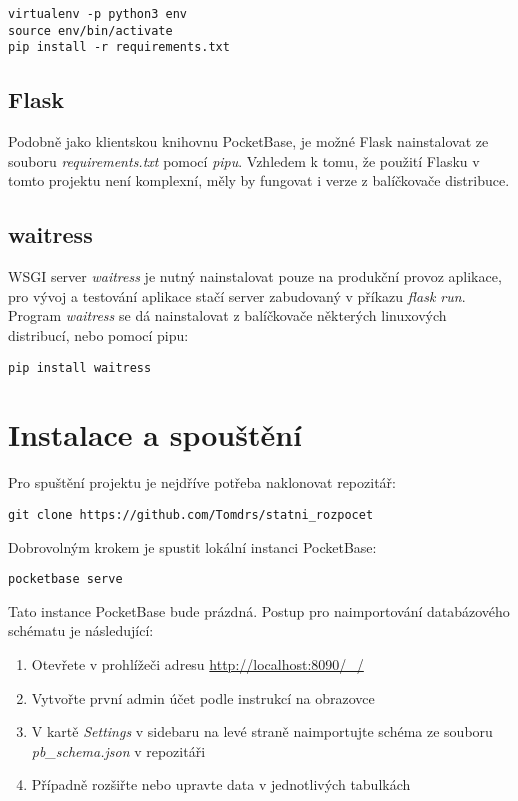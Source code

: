 \documentclass[11pt,a4paper,twoside,openright]{report}
\begin{document}
\begin{verbatim}
virtualenv -p python3 env
source env/bin/activate
pip install -r requirements.txt
\end{verbatim}

\subsection{Flask}
Podobně jako klientskou knihovnu PocketBase, je možné Flask nainstalovat ze souboru
\emph{requirements.txt} pomocí \emph{pipu}. Vzhledem k tomu, že použití Flasku v tomto
projektu není komplexní, měly by fungovat i verze z balíčkovače distribuce.

\subsection{waitress}
WSGI server \emph{waitress} je nutný nainstalovat pouze na produkční provoz aplikace,
pro vývoj a testování aplikace stačí server zabudovaný v příkazu \emph{flask run}. Program \emph{waitress} se dá nainstalovat z balíčkovače některých linuxových distribucí, nebo pomocí pipu:

\begin{verbatim}
pip install waitress
\end{verbatim}

\section{Instalace a spouštění}
Pro spuštění projektu je nejdříve potřeba naklonovat
repozitář:

\begin{verbatim}
git clone https://github.com/Tomdrs/statni_rozpocet
\end{verbatim}

Dobrovolným krokem je spustit lokální instanci PocketBase:

\begin{verbatim}
pocketbase serve
\end{verbatim}

Tato instance PocketBase bude prázdná. Postup pro naimportování
databázového schématu je následující:

\begin{enumerate}
  \item Otevřete v prohlížeči adresu \url{http://localhost:8090/_/}
  \item Vytvořte první admin účet podle instrukcí na obrazovce
  \item V kartě \emph{Settings} v sidebaru na levé straně naimportujte schéma ze souboru \emph{pb\_schema.json} v repozitáři
  \item Případně rozšiřte nebo upravte data v jednotlivých tabulkách
\end{enumerate}
\end{document}
